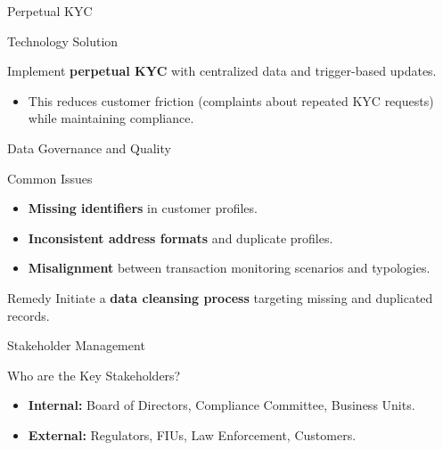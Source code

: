 \documentclass{beamer}
\begin{document}
	\begin{frame}{Perpetual KYC}
		\begin{block}{Technology Solution}
			\begin{center}
				Implement \textbf{perpetual KYC} with centralized data and trigger-based updates.
			\end{center}
		\end{block}
		\begin{itemize}
			\item This reduces customer friction (complaints about repeated KYC requests) while maintaining compliance.
		\end{itemize}
	\end{frame}
	
	\begin{frame}{Data Governance and Quality}
		\begin{block}{Common Issues}
			\begin{itemize}
				\item \textbf{Missing identifiers} in customer profiles.
				\item \textbf{Inconsistent address formats} and duplicate profiles.
				\item \textbf{Misalignment} between transaction monitoring scenarios and typologies.
			\end{itemize}
		\end{block}
		\begin{alertblock}{Remedy}
			Initiate a \textbf{data cleansing process} targeting missing and duplicated records.
		\end{alertblock}
	\end{frame}
	
	\begin{frame}{Stakeholder Management}
		\begin{block}{Who are the Key Stakeholders?}
			\begin{itemize}
				\item \textbf{Internal:} Board of Directors, Compliance Committee, Business Units.
				\item \textbf{External:} Regulators, FIUs, Law Enforcement, Customers.
			\end{itemize}
		\end{block}
	\end{frame}
	
\end{document}
